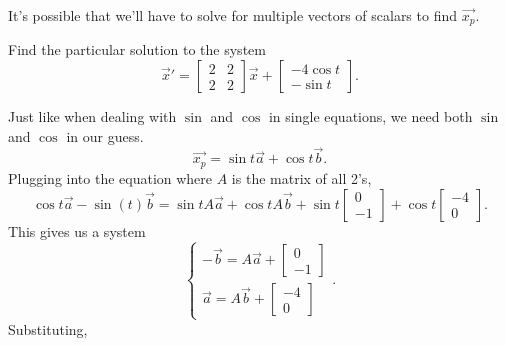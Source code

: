 \noindent
It's possible that we'll have to solve for multiple vectors of scalars to find $\vec{x_p}$.
\begin{example}
	Find the particular solution to the system
	\begin{equation*}
		\vec{x}' = \begin{bmatrix}
			2 & 2 \\
			2 & 2
		\end{bmatrix}\vec{x} + \begin{bmatrix}
			-4\cos{t} \\
			-\sin{t}
		\end{bmatrix}.
	\end{equation*}
\end{example}
Just like when dealing with $\sin$ and $\cos$ in single equations, we need both $\sin$ and $\cos$ in our guess.
\begin{equation*}
	\vec{x_p} = \sin{t}\vec{a} + \cos{t}\vec{b}.
\end{equation*}
Plugging into the equation where $A$ is the matrix of all 2's,
\begin{equation*}
	\cos{t}\vec{a} - \sin(t)\vec{b} = \sin{t}A\vec{a} + \cos{t}A\vec{b} + \sin{t}\begin{bmatrix}
		0 \\
		-1
	\end{bmatrix} + \cos{t}\begin{bmatrix}
		-4 \\
		0
	\end{bmatrix}.
\end{equation*}
This gives us a system
\begin{equation*}
	\begin{cases}
		-\vec{b} = A\vec{a} + \begin{bmatrix}
			0 \\
			-1
		\end{bmatrix} \\
		\vec{a} = A\vec{b} + \begin{bmatrix}
			-4 \\
			0
		\end{bmatrix}
	\end{cases}.
\end{equation*}
Substituting,
